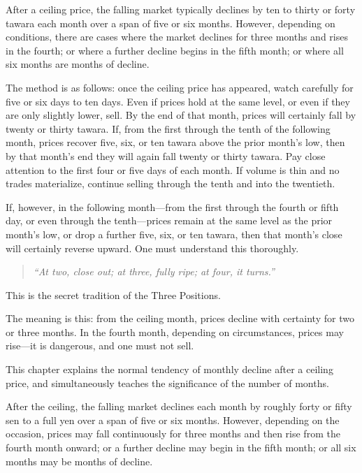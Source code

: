 \begin{sokyubox}
{\small\itshape\color{sokyubar} }

\medskip
After a ceiling price, the falling market typically declines by ten to
thirty or forty tawara each month over a span of five or six months.
However, depending on conditions, there are cases where the market
declines for three months and rises in the fourth; or where a further
decline begins in the fifth month; or where all six months are months of
decline.

The method is as follows: once the ceiling price has appeared, watch
carefully for five or six days to ten days. Even if prices hold at the
same level, or even if they are only slightly lower, sell. By the end of
that month, prices will certainly fall by twenty or thirty tawara. If,
from the first through the tenth of the following month, prices recover
five, six, or ten tawara above the prior month's low, then by that
month's end they will again fall twenty or thirty tawara. Pay close
attention to the first four or five days of each month. If volume is thin
and no trades materialize, continue selling through the tenth and into
the twentieth.

If, however, in the following month---from the first through the fourth
or fifth day, or even through the tenth---prices remain at the same level
as the prior month's low, or drop a further five, six, or ten tawara,
then that month's close will certainly reverse upward. One must understand
this thoroughly.

\begin{quote}
\textit{``At two, close out; at three, fully ripe; at four, it turns.''}\\
\end{quote}

\noindent This is the secret tradition of the Three Positions.

The meaning is this: from the ceiling month, prices decline with
certainty for two or three months. In the fourth month, depending on
circumstances, prices may rise---it is dangerous, and one must not sell.
\end{sokyubox}

\commentary
This chapter explains the normal tendency of monthly decline after a
ceiling price, and simultaneously teaches the significance of the number
of months.

After the ceiling, the falling market declines each month by roughly
forty or fifty sen to a full yen over a span of five or six months.
However, depending on the occasion, prices may fall continuously for
three months and then rise from the fourth month onward; or a further
decline may begin in the fifth month; or all six months may be months of
decline.

